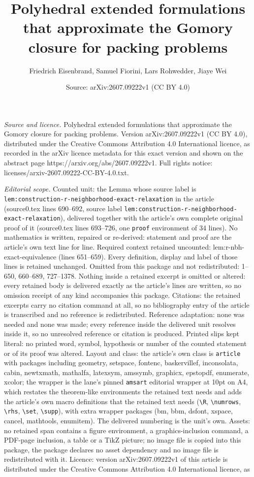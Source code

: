 \documentclass[10pt,a4paper]{amsart}
\title[Polyhedral extended formulations that approximate the Gomory]{Polyhedral extended formulations that approximate the Gomory closure for packing problems}
\author{Friedrich Eisenbrand, Samuel Fiorini, Lars Rohwedder, Jiaye Wei}
\date{Source: arXiv:2607.09222v1 (CC BY 4.0)}
\begin{document}
\maketitle

\noindent\emph{Source and licence.} Polyhedral extended formulations that approximate the Gomory closure for packing problems. Version arXiv:2607.09222v1 (CC BY 4.0), distributed under the Creative Commons Attribution 4.0 International licence, as recorded in the arXiv licence metadata for this exact version and shown on the abstract page https://arxiv.org/abs/2607.09222v1. Full rights notice: licenses/arxiv-2607.09222-CC-BY-4.0.txt.\par\smallskip

\noindent\textit{Editorial scope.} Counted unit: the Lemma whose source label is \texttt{lem:construction-r-neighborhood-exact-relaxation} in the article (source0.tex lines 690--692, source label \texttt{lem:construction-r-neighborhood-exact-relaxation}), delivered together with the article's own complete original proof of it (source0.tex lines 693--726, one \texttt{proof} environment of 34 lines). No mathematics is written, repaired or re-derived: statement and proof are the article's own text line for line. Required context retained uncounted: lem:r-nbh-exact-equivalence (lines 651--659). Every definition, display and label of those lines is retained unchanged. Omitted from this package and not redistributed: 1--650, 660--689, 727--1378. Nothing inside a retained excerpt is omitted or altered: every retained body is delivered exactly as the article's lines are written, so no omission receipt of any kind accompanies this package. Citations: the retained excerpts carry no citation command at all, so no bibliography entry of the article is transcribed and no reference is redistributed. Reference adaptation: none was needed and none was made; every reference inside the delivered unit resolves inside it, so no unresolved reference or citation is produced. Printed slips kept literal: no printed word, symbol, hypothesis or number of the counted statement or of its proof was altered. Layout and class: the article's own class is \texttt{article} with packages including geometry, setspace, fontenc, baskervillef, inconsolata, cabin, newtxmath, mathalfa, latexsym, amssymb, graphicx, epstopdf, enumerate, xcolor; the wrapper is the lane's pinned \texttt{amsart} editorial wrapper at 10pt on A4, which restates the theorem-like environments the retained text needs and adds the article's own macro definitions that the retained text needs (\texttt{\textbackslash R}, \texttt{\textbackslash numrows}, \texttt{\textbackslash rhs}, \texttt{\textbackslash set}, \texttt{\textbackslash supp}), with extra wrapper packages (bm, bbm, dsfont, xspace, cancel, mathtools, enumitem). The delivered numbering is the unit's own. Assets: no retained span contains a figure environment, a graphics-inclusion command, a PDF-page inclusion, a table or a TikZ picture; no image file is copied into this package, the package declares no asset dependency and no image file is redistributed with it. Licence: version arXiv:2607.09222v1 of this article is distributed under the Creative Commons Attribution 4.0 International licence, as 
\end{document}
